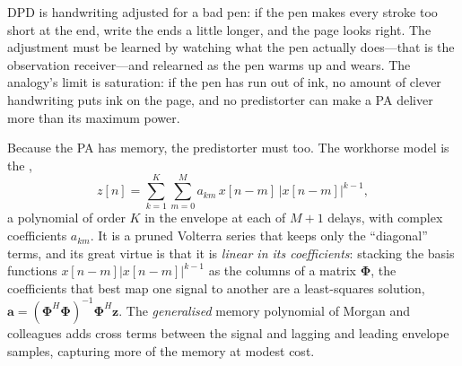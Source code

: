 
\begin{analogy}
DPD is handwriting adjusted for a bad pen: if the pen makes every stroke too short at the end, write
the ends a little longer, and the page looks right. The adjustment must be learned by watching what the
pen actually does---that is the observation receiver---and relearned as the pen warms up and wears.
The analogy's limit is saturation: if the pen has run out of ink, no amount of clever handwriting puts
ink on the page, and no predistorter can make a PA deliver more than its maximum power.
\end{analogy}

Because the PA has memory, the predistorter must too. The workhorse model is the ,
\begin{equation}
z[n]=\sum_{k=1}^{K}\sum_{m=0}^{M}a_{km}\,x[n-m]\,\big|x[n-m]\big|^{k-1},
\label{eq:ch07:mp}
\end{equation}
a polynomial of order $K$ in the envelope at each of $M+1$ delays, with complex coefficients $a_{km}$.
It is a pruned Volterra series that keeps only the ``diagonal'' terms, and its great virtue is that it is
\emph{linear in its coefficients}: stacking the basis functions $x[n-m]|x[n-m]|^{k-1}$ as the columns of
a matrix $\boldsymbol\Phi$, the coefficients that best map one signal to another are a least-squares
solution, $\mathbf a=(\boldsymbol\Phi^H\boldsymbol\Phi)^{-1}\boldsymbol\Phi^H\mathbf z$. The
\emph{generalised} memory polynomial of Morgan and colleagues adds cross terms between the signal and
lagging and leading envelope samples, capturing more of the memory at modest cost.

